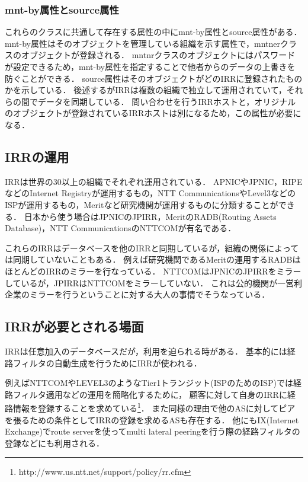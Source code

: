 \subsubsection{mnt-by属性とsource属性}
これらのクラスに共通して存在する属性の中にmnt-by属性とsource属性がある．
mnt-by属性はそのオブジェクトを管理している組織を示す属性で，mntnerクラスのオブジェクトが登録される．
mntnrクラスのオブジェクトにはパスワードが設定できるため，mnt-by属性を指定することで他者からのデータの上書きを防ぐことができる．
source属性はそのオブジェクトがどのIRRに登録されたものかを示している．
後述するがIRRは複数の組織で独立して運用されていて，それらの間でデータを同期している．
問い合わせを行うIRRホストと，オリジナルのオブジェクトが登録されているIRRホストは別になるため，この属性が必要になる．

\subsection{IRRの運用}

IRRは世界の30以上の組織でそれぞれ運用されている．
APNICやJPNIC，RIPEなどのInternet Registryが運用するもの，NTT CommunicationsやLevel3などのISPが運用するもの，Meritなど研究機関が運用するものに分類することができる．
日本から使う場合はJPNICのJPIRR，MeritのRADB(Routing Assets Database)，NTT CommunicationsのNTTCOMが有名である．

これらのIRRはデータベースを他のIRRと同期しているが，組織の関係によっては同期していないこともある．
例えば研究機関であるMeritの運用するRADBはほとんどのIRRのミラーを行なっている．
NTTCOMはJPNICのJPIRRをミラーしているが，JPIRRはNTTCOMをミラーしていない．
これは公的機関が一営利企業のミラーを行うということに対する大人の事情でそうなっている．

\subsection{IRRが必要とされる場面}

IRRは任意加入のデータベースだが，利用を迫られる時がある．
基本的には経路フィルタの自動生成を行うためにIRRが使われる．

例えばNTTCOMやLEVEL3のようなTier1トランジット(ISPのためのISP)では経路フィルタ適用などの運用を簡略化するために，
顧客に対して自身のIRRに経路情報を登録することを求めている\footnote{http://www.us.ntt.net/support/policy/rr.cfm}．
また同様の理由で他のASに対してピアを張るための条件としてIRRの登録を求めるASも存在する．
他にもIX(Internet Exchange)でroute serverを使ってmulti lateral peeringを行う際の経路フィルタの登録などにも利用される．

